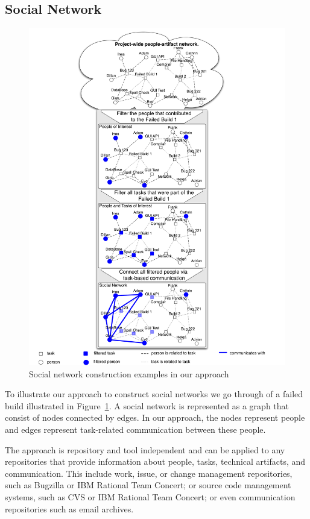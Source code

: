 \subsection{Social Network}
\begin{figure}[t!]
\begin{center}
\includegraphics[height=1.3\textwidth]{./figures/grand_figure}
\caption{Social network construction examples in our approach}
\label{fig:network}
\end{center}
\end{figure}
To illustrate our approach to construct social networks we go through of a failed build illustrated in Figure~\ref{fig:network}. 
A social network is represented as a graph that consist of nodes connected by edges. 
In our approach, the nodes represent people and edges represent task-related communication between these people.

The approach is repository and tool independent and can be applied to any repositories that provide information about people, tasks, technical artifacts, and communication. 
This include work, issue, or change management repositories, such as Bugzilla or IBM Rational Team Concert; or source code management systems, such as CVS or IBM Rational Team Concert; or even communication repositories such as email archives.

